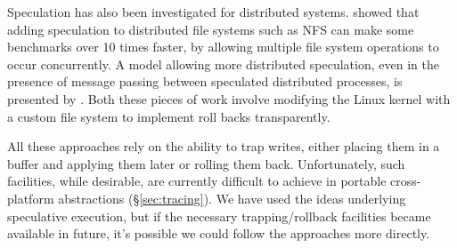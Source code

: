 Speculation has also been investigated for distributed systems. \citet{nightingale2005speculative} showed that adding speculation to distributed file systems such as NFS can make some benchmarks over 10 times faster, by allowing multiple file system operations to occur concurrently. A model allowing more distributed speculation, even in the presence of message passing between speculated distributed processes, is presented by \citet{tapus2006distributed}. Both these pieces of work involve modifying the Linux kernel with a custom file system to implement roll backs transparently.

All these approaches rely on the ability to trap writes, either placing them in a buffer and applying them later or rolling them back. Unfortunately, such facilities, while desirable, are currently difficult to achieve in portable cross-platform abstractions (\S\ref{sec:tracing}). We have used the ideas underlying speculative execution, but if the necessary trapping/rollback facilities became available in future, it's possible we could follow the approaches more directly.
